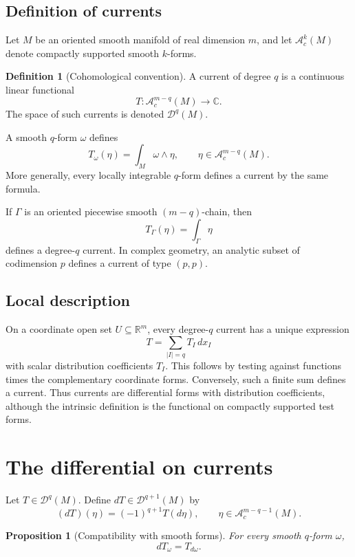 \documentclass[11pt,a4paper]{article}
\newtheorem{proposition}[theorem]{Proposition}
\theoremstyle{definition}
\newtheorem{definition}[theorem]{Definition}
\theoremstyle{remark}
\newcommand{\C}{\mathbb C}
\newcommand{\R}{\mathbb R}
\newcommand{\A}{\mathcal A}
\newcommand{\Dcur}{\mathcal D}
\begin{document}
\subsection{Definition of currents}

Let $M$ be an oriented smooth manifold of real dimension $m$, and let $\A_c^k(M)$ denote compactly supported smooth $k$-forms.

\begin{definition}[Cohomological convention]
A current of degree $q$ is a continuous linear functional
\[
T:\A_c^{m-q}(M)\longrightarrow\C.
\]
The space of such currents is denoted $\Dcur^q(M)$.
\end{definition}

A smooth $q$-form $\omega$ defines
\[
T_\omega(\eta)=\int_M\omega\wedge\eta,
\qquad \eta\in\A_c^{m-q}(M).
\]
More generally, every locally integrable $q$-form defines a current by the same formula.

If $\Gamma$ is an oriented piecewise smooth $(m-q)$-chain, then
\[
T_\Gamma(\eta)=\int_\Gamma\eta
\]
defines a degree-$q$ current. In complex geometry, an analytic subset of codimension $p$ defines a current of type $(p,p)$.

\subsection{Local description}

On a coordinate open set $U\subseteq\R^m$, every degree-$q$ current has a unique expression
\[
T=\sum_{|I|=q}T_I\,dx_I
\]
with scalar distribution coefficients $T_I$. This follows by testing against functions times the complementary coordinate forms. Conversely, such a finite sum defines a current. Thus currents are differential forms with distribution coefficients, although the intrinsic definition is the functional on compactly supported test forms.

\section{The differential on currents}

Let $T\in\Dcur^q(M)$. Define $dT\in\Dcur^{q+1}(M)$ by
\[
(dT)(\eta)=(-1)^{q+1}T(d\eta),
\qquad \eta\in\A_c^{m-q-1}(M).
\]

\begin{proposition}[Compatibility with smooth forms]
For every smooth $q$-form $\omega$,
\[
dT_\omega=T_{d\omega}.
\]
\end{proposition}
\end{document}
